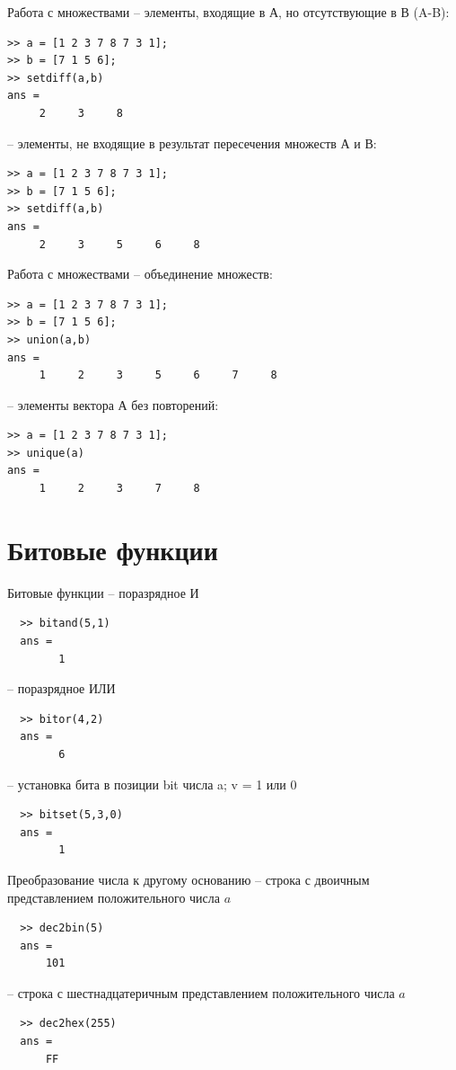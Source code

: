 \documentclass[11pt, compress]{beamer}
\begin{document}
\begin{frame}[fragile]{Работа с множествами}
   -- элементы, входящие в А, но отсутствующие в В (A-B):
\begin{lstlisting}
>> a = [1 2 3 7 8 7 3 1];
>> b = [7 1 5 6];
>> setdiff(a,b)
ans =
     2     3     8
\end{lstlisting}
   -- элементы, не входящие в результат пересечения множеств А и В:
\begin{lstlisting}
>> a = [1 2 3 7 8 7 3 1];
>> b = [7 1 5 6];
>> setdiff(a,b)
ans =
     2     3     5     6     8
\end{lstlisting}
\end{frame}

\begin{frame}[fragile]{Работа с множествами}
   -- объединение множеств:
\begin{lstlisting}
>> a = [1 2 3 7 8 7 3 1];
>> b = [7 1 5 6];
>> union(a,b)
ans =
     1     2     3     5     6     7     8
\end{lstlisting}
   -- элементы вектора А без повторений:
\begin{lstlisting}
>> a = [1 2 3 7 8 7 3 1];
>> unique(a)
ans =
     1     2     3     7     8
\end{lstlisting}
\end{frame}

\section{Битовые функции}

\begin{frame}[fragile]{Битовые функции}
   -- поразрядное И
\begin{lstlisting}
  >> bitand(5,1)
  ans =
        1
\end{lstlisting}
   -- поразрядное ИЛИ
\begin{lstlisting}
  >> bitor(4,2)
  ans =
        6
\end{lstlisting}
   -- установка бита в позиции bit числа a; v = 1 или 0
\begin{lstlisting}
  >> bitset(5,3,0)
  ans =
        1
\end{lstlisting}
\end{frame}

\begin{frame}[fragile]{Преобразование числа к другому основанию}  
   -- \alert{строка} с двоичным представлением положительного числа $a$
  \begin{lstlisting}
  >> dec2bin(5)
  ans =
      101
  \end{lstlisting}
   -- \alert{строка} с шестнадцатеричным представлением положительного числа $a$
  \begin{lstlisting}
  >> dec2hex(255)
  ans =
      FF
  \end{lstlisting}  
\end{frame}
\end{document}
